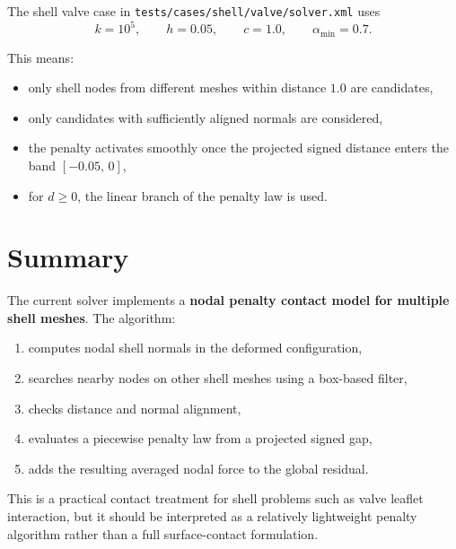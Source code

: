 \documentclass[11pt]{article}
\begin{document}
The shell valve case in
\texttt{tests/cases/shell/valve/solver.xml}
uses
\[
k = 10^5,\qquad
h = 0.05,\qquad
c = 1.0,\qquad
\alpha_{\min} = 0.7.
\]

This means:
\begin{itemize}[leftmargin=*]
\item only shell nodes from different meshes within distance $1.0$ are candidates,
\item only candidates with sufficiently aligned normals are considered,
\item the penalty activates smoothly once the projected signed distance enters the band $[-0.05,\,0]$,
\item for $d \ge 0$, the linear branch of the penalty law is used.
\end{itemize}

\section{Summary}

The current solver implements a \textbf{nodal penalty contact model for multiple shell meshes}. The algorithm:
\begin{enumerate}[leftmargin=*]
\item computes nodal shell normals in the deformed configuration,
\item searches nearby nodes on other shell meshes using a box-based filter,
\item checks distance and normal alignment,
\item evaluates a piecewise penalty law from a projected signed gap,
\item adds the resulting averaged nodal force to the global residual.
\end{enumerate}

This is a practical contact treatment for shell problems such as valve leaflet interaction, but it should be interpreted as a relatively lightweight penalty algorithm rather than a full surface-contact formulation.
\end{document}
